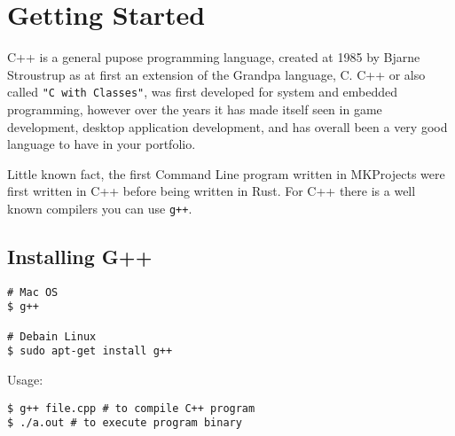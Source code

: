 \chapter{Getting Started}

C++ is a general pupose programming language, created at 1985 by Bjarne Stroustrup as at first an extension
of the Grandpa language, C. C++ or also called \verb!"C with Classes"!, was first developed for system and embedded
programming, however over the years it has made itself seen in game development, desktop application development, 
and has overall been a very good language to have in your portfolio.  

Little known fact, the first Command Line program written in MKProjects were first written in C++ before being 
written in Rust. For C++ there is a well known compilers you can use \verb!g++!. 

\section{Installing G++}
\begin{verbatim}
# Mac OS
$ g++

# Debain Linux
$ sudo apt-get install g++
\end{verbatim}

\noindent Usage: 

\begin{verbatim}
$ g++ file.cpp # to compile C++ program 
$ ./a.out # to execute program binary 
\end{verbatim}